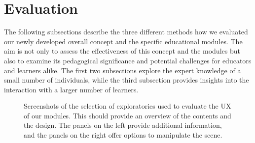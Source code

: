 \section{Evaluation}
The following subsections describe the three different methods how we evaluated our newly developed overall concept and the specific educational modules. The aim is not only to assess the effectiveness of this concept and the modules but also to examine its pedagogical significance and potential challenges for educators and learners alike. The first two subsections explore the expert knowledge of a small number of individuals, while the third subsection provides insights into the interaction with a larger number of learners.

\begin{figure}[h!tb]
	\centering
	\captionsetup{labelfont=bf,textfont=it}
	\caption{Screenshots of the selection of exploratories used to evaluate the UX of our modules. This should provide an overview of the contents and the design. The panels on the left provide additional information, and the panels on the right offer options to manipulate the scene.}
	\label{fig:uxEval}
\end{figure}
